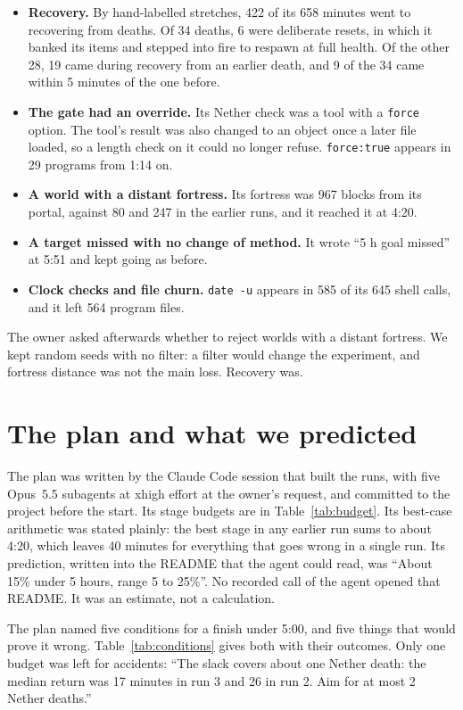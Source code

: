 \documentclass[11pt,a4paper]{article}
\begin{document}
\begin{itemize}
  \item \textbf{Recovery.} By hand-labelled stretches, 422 of its 658 minutes went to recovering from deaths. Of 34 deaths, 6 were deliberate resets, in which it banked its items and stepped into fire to respawn at full health. Of the other 28, 19 came during recovery from an earlier death, and 9 of the 34 came within 5 minutes of the one before.
  \item \textbf{The gate had an override.} Its Nether check was a tool with a \texttt{force} option. The tool's result was also changed to an object once a later file loaded, so a length check on it could no longer refuse. \texttt{force:true} appears in 29 programs from 1:14 on.
  \item \textbf{A world with a distant fortress.} Its fortress was 967 blocks from its portal, against 80 and 247 in the earlier runs, and it reached it at 4:20.
  \item \textbf{A target missed with no change of method.} It wrote ``5 h goal missed'' at 5:51 and kept going as before.
  \item \textbf{Clock checks and file churn.} \texttt{date -u} appears in 585 of its 645 shell calls, and it left 564 program files.
\end{itemize}

The owner asked afterwards whether to reject worlds with a distant fortress. We kept random seeds with no filter: a filter would change the experiment, and fortress distance was not the main loss. Recovery was.

\section{The plan and what we predicted}
\label{sec:planmade}

The plan was written by the Claude Code session that built the runs, with five Opus~5.5 subagents at xhigh effort at the owner's request, and committed to the project before the start. Its stage budgets are in Table~\ref{tab:budget}. Its best-case arithmetic was stated plainly: the best stage in any earlier run sums to about 4:20, which leaves 40 minutes for everything that goes wrong in a single run. Its prediction, written into the README that the agent could read, was ``About 15\% under 5 hours, range 5 to 25\%''. No recorded call of the agent opened that README. It was an estimate, not a calculation.

The plan named five conditions for a finish under 5:00, and five things that would prove it wrong. Table~\ref{tab:conditions} gives both with their outcomes. Only one budget was left for accidents: ``The slack covers about one Nether death: the median return was 17 minutes in run 3 and 26 in run 2. Aim for at most 2 Nether deaths.''
\end{document}
